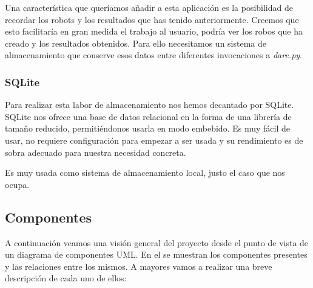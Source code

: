 Una característica que queríamos añadir a esta aplicación es la
posibilidad de recordar los robots y los resultados que has tenido
anteriormente. Creemos que esto facilitaría en gran medida el trabajo
al usuario, podría ver los robos que ha creado y los resultados
obtenidos. Para ello necesitamos un sistema de almacenamiento que
conserve esos datos entre diferentes invocaciones a \emph{dare.py}.

\subsubsection{SQLite}

Para realizar esta labor de almacenamiento nos hemos decantado por
SQLite\cite{SQLite}. SQLite nos ofrece una base de datos relacional en
la forma de una librería de tamaño reducido, permitiéndonos usarla en
modo embebido. Es muy fácil de usar, no requiere configuración para
empezar a ser usada y su rendimiento es de sobra adecuado para nuestra
necesidad concreta.

Es muy usada como sistema de almacenamiento local, justo el caso que
nos ocupa.

\subsection{Componentes}
\label{COMPONENTES-DARE}
A continuación veamos una visión general del proyecto desde el punto
de vista de un diagrama de componentes UML. En el se muestran los
componentes presentes y las relaciones entre los mismos. A mayores
vamos a realizar una breve descripción de cada uno de ellos:

